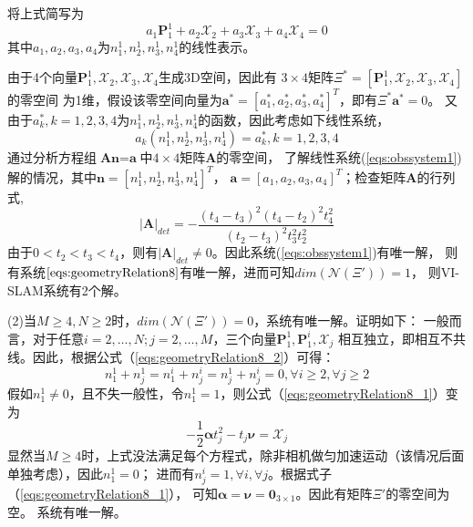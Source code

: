 \documentclass{article}
\begin{document}
将上式简写为
\begin{equation}
    a_{1}\textbf{P}_1^1+a_2\mathcal{X}_2+a_3\mathcal{X}_3+a_4\mathcal{X}_4=0
\end{equation}
其中$a_1,a_2,a_3,a_4$为$n_1^1,n_2^1,n_3^1,n_4^1$的线性表示。
\par
由于4个向量$\textbf{P}_1^1,\mathcal{X}_2,\mathcal{X}_3,\mathcal{X}_4$生成3D空间，因此有
$3\times 4$矩阵$\Xi^*=\left[\textbf{P}_1^1,\mathcal{X}_2,\mathcal{X}_3,\mathcal{X}_4\right]$的零空间
为1维，假设该零空间向量为$\textbf{a}^*=\left[a_1^*,a_2^*,a_3^*,a_4^*\right]^T$，即有$\Xi^*\textbf{a}^*=0$。
又由于$a_k^*,k=1,2,3,4$为$n_1^1,n_2^1,n_3^1,n_4^1$的函数，因此考虑如下线性系统，
\begin{equation}\label{eqs:obssystem1}
    a_k(n_1^1,n_2^1,n_3^1,n_4^1)=a_k^*, k=1,2,3,4
\end{equation}
通过分析方程组$\textbf{A}\textbf{n}=\textbf{a}$中$4\times 4$矩阵$\textbf{A}$的零空间，
了解线性系统(\ref{eqs:obssystem1})解的情况，其中$\textbf{n}=\left[n_1^1,n_2^1,n_3^1,n_4^1\right]^T$，
$\textbf{a}=\left[a_1,a_2,a_3,a_4\right]^T$；检查矩阵$\textbf{A}$的行列式,
\begin{equation}
    |\textbf{A}|_{det}=-\frac{(t_4-t_3)^{2}(t_4-t_2)^{2}t_4^2}{(t_2-t_3)^{2}t_3^{2}t_2^{2}}
\end{equation}
由于$0<t_2<t_3<t_4$，则有$|\textbf{A}|_{det}\not=0$。因此系统(\ref{eqs:obssystem1})有唯一解，
则有系统$\ref{eqs:geometryRelation8}$有唯一解，进而可知$dim(\mathcal{N}(\Xi'))=1$，
则VI-SLAM系统有2个解。

\par
(2)当$M\geqslant 4,N\geqslant 2$时，$dim(\mathcal{N}(\Xi'))=0$，系统有唯一解。证明如下：
一般而言，对于任意$i=2,\dots,N; j=2,\dots,M$，三个向量$\textbf{P}_1^1,\textbf{P}_1^i,\mathcal{X}_j$
相互独立，即相互不共线。因此，根据公式（\ref{eqs:geometryRelation8_2}）可得：
\begin{equation}
    n_1^1+n_j^1=n_1^i+n_j^i=n_j^1+n_j^i=0, \forall i\geqslant 2, \forall j\geqslant 2
\end{equation}
假如$n_1^1\not=0$，且不失一般性，令$n_1^1=1$，则公式（\ref{eqs:geometryRelation8_1}）变为
\begin{equation}
    -\frac{1}{2}\mathbf{\alpha}t_j^2-t_j\mathbf{\nu}=\mathcal{X}_j
\end{equation}
显然当$M\geqslant 4$时，上式没法满足每个方程式，除非相机做匀加速运动（该情况后面单独考虑），因此$n_1^1=0$；
进而有$n_j^i=1, \forall i, \forall j$。根据式子（\ref{eqs:geometryRelation8_1}），
可知$\mathbf{\alpha}=\mathbf{\nu}=\textbf{0}_{3\times 1}$。因此有矩阵$\Xi'$的零空间为空。
系统有唯一解。
\end{document}
